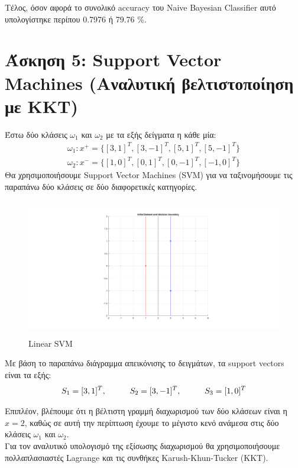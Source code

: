 \documentclass{article}
\begin{document}
	\noindent
	Τέλος, όσον αφορά το συνολικό accuracy του Naive Bayesian Classifier αυτό υπολογίστηκε περίπου 0.7976 ή 79.76 \%.
	
\section*{Άσκηση 5: Support Vector Machines (Αναλυτική βελτιστοποίηση με ΚΚΤ)}
	Έστω δύο κλάσεις $ω_{1}$ και $ω_{2}$ με τα εξής δείγματα η κάθε μία:
	\begin{align*}
		ω_{1}: x^{+} = \{ [3,1]^{T}, [3,-1]^{T}, [5,1]^{T}, [5,-1]^{T} \} \\
		ω_{2}: x^{-} = \{ [1,0]^{T}, [0,1]^{T}, [0,-1]^{T}, [-1,0]^{T} \}
	\end{align*}
	\noindent
	Θα χρησιμοποιήσουμε Support Vector Machines (SVM) για να ταξινομήσουμε τις παραπάνω δύο κλάσεις σε δύο διαφορετικές κατηγορίες.\\
	
	\pagebreak
	\begin{figure}[h!]
		\centering
		\includegraphics[height=6cm,width=\linewidth]{../exercise2_5/images/ex5_linear.png}
		\caption{Linear SVM}
	\end{figure}
	\noindent
	Με βάση το παραπάνω διάγραμμα απεικόνισης το δειγμάτων, τα support vectors είναι τα εξής:
	\begin{align*}
		S_{1} = [3,1]^{T}, \hspace*{1cm} S_{2} = [3,-1]^{T}, \hspace*{1cm} S_{3} = [1,0]^{T}
	\end{align*}
	
	\noindent
	Επιπλέον, βλέπουμε ότι η βέλτιστη γραμμή διαχωρισμού των δύο κλάσεων είναι η $x=2$, καθώς σε αυτή την περίπτωση έχουμε το μέγιστο κενό ανάμεσα στις δύο κλάσεις $ω_{1}$ και $ω_{2}$. \\
	
	\noindent
	Για τον αναλυτικό υπολογισμό της εξίσωσης διαχωρισμού θα χρησιμοποιήσουμε πολλαπλασιαστές Lagrange και τις συνθήκες Karush-Khun-Tucker (KKT).\\
	
\end{document}

